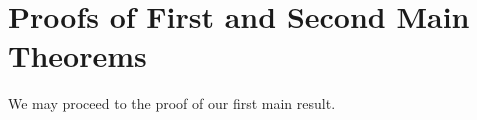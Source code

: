 \documentclass{amsart}
\newtheorem{remark}[theorem]{Remark}
\begin{document}

\section{Proofs of  First and  Second Main Theorems}\label{s5}

We may proceed to the proof of our first main result.
\end{document}
